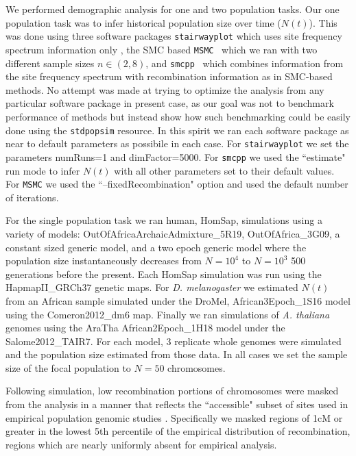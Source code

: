 \documentclass[12pt,halfline,a4paper]{ouparticle}
\newcommand{\stdpopsim}{\texttt{stdpopsim}\xspace}
\newcommand{\MSMC}{\texttt{MSMC}\xspace}
\newcommand{\smcpp}{\texttt{smcpp}\xspace}
\newcommand{\stairwayplot}{\texttt{stairwayplot}\xspace}
\begin{document}
We performed demographic analysis for one and two population tasks.
Our one population task was to infer historical population size over
time ($N(t)$). This was done using three software packages \stairwayplot
which uses site frequency spectrum information only \citep{liu2015exploring},
the SMC based \MSMC~\citep{schiffels2014inferring} which we ran with two different
sample sizes $n\in (2 , 8)$, and \smcpp~\citep{terhorst2017robust} 
which combines information from the site frequency spectrum with 
recombination information as in SMC-based methods. No attempt
was made at trying to optimize the analysis from
any particular software package in present case,
as our goal was not to benchmark performance of methods but
instead show how such benchmarking could be easily done using
the \stdpopsim resource. In this spirit we ran each software package as near
to default parameters as possibile in each case. For \stairwayplot we
set the parameters numRuns=1 and dimFactor=5000. For \smcpp we used the
``estimate" run mode to infer $N(t)$ with all other parameters set
to their default values. For \MSMC we used the ``--fixedRecombination"
option and used the default number of iterations.

For the single population task we ran human, HomSap, simulations
using a variety of models: OutOfAfricaArchaicAdmixture\_5R19, OutOfAfrica\_3G09,
a constant sized generic model, and a two epoch generic model where the
population size instantaneously decreases from $N=10^4$ to $N=10^3$ 500 
generations before the present. Each HomSap simulation was run
using the HapmapII\_GRCh37 genetic maps. For \emph{D. melanogaster}
we estimated $N(t)$ from an African sample simulated under the DroMel, 
African3Epoch\_1S16 model using the Comeron2012\_dm6 map. Finally we ran
simulations of \emph{A. thaliana} genomes using the AraTha African2Epoch\_1H18
model under the Salome2012\_TAIR7. For each model, 3 replicate whole genomes were
simulated and the population size estimated from those data. In all cases we
set the sample size of the focal population to $N=50$ chromosomes. 

Following simulation, low recombination portions of chromosomes were masked
from the analysis in a manner that reflects the ``accessible" subset of sites
used in empirical population genomic studies \citep[e.g.,][]{danecek20111000,langley2012genomic}.
Specifically we masked regions of 1cM or greater in the lowest 5th percentile of the empirical
distribution of recombination, regions which are nearly uniformly absent for
empirical analysis.  
\end{document}
